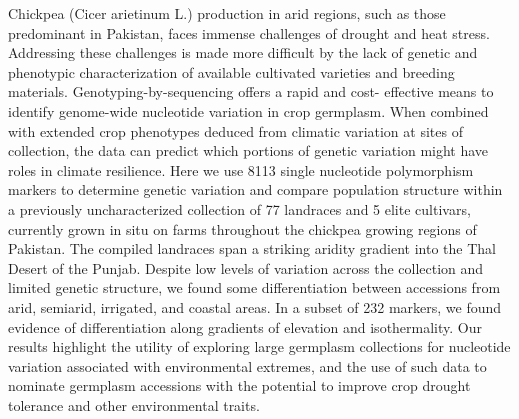 Chickpea (Cicer arietinum L.) production in arid regions, such as those predominant in Pakistan, faces immense challenges of drought and heat stress. Addressing these challenges is made more difficult by the lack of genetic and phenotypic characterization of available cultivated varieties and breeding materials. Genotyping-by-sequencing offers a rapid and cost- effective means to identify genome-wide nucleotide variation in crop germplasm. When combined with extended crop phenotypes deduced from climatic variation at sites of collection, the data can predict which portions of genetic variation might have roles in climate resilience. Here we use 8113 single nucleotide polymorphism markers to determine genetic variation and compare population structure within a previously uncharacterized collection of 77 landraces and 5 elite cultivars, currently grown in situ on farms throughout the chickpea growing regions of Pakistan. The compiled landraces span a striking aridity gradient into the Thal Desert of the Punjab. Despite low levels of variation across the collection and limited genetic structure, we found some differentiation between accessions from arid, semiarid, irrigated, and coastal areas. In a subset of 232 markers, we found evidence of differentiation along gradients of elevation and isothermality. Our results highlight the utility of exploring large germplasm collections for nucleotide variation associated with environmental extremes, and the use of such data to nominate germplasm accessions with the potential to improve crop drought tolerance and other environmental traits.
